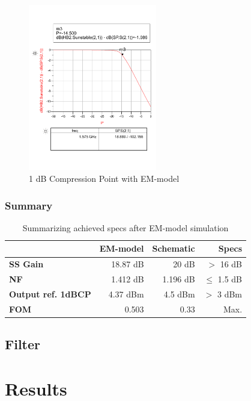 \documentclass[a4paper]{article}        %
\begin{document}
			\begin{figure}[H]
			\centering
				\includegraphics[width=0.5\textwidth]{fig/LNA/compression_post.pdf}
			\caption{1 dB Compression Point with EM-model}
			\label{fig:lna_1db_post}
			\end{figure}

		\subsubsection{Summary}

			\begin{table}[H]
			\centering
			\begin{tabular}{|l|r|r|r|}
				\hline
				 &  \textbf{EM-model} &  \textbf{Schematic} & \textbf{Specs} \\
				\hline
				\textbf{SS Gain} & 18.87 dB &  20 dB & $>$ 16 dB \\
				\hline
				\textbf{NF} & 1.412 dB & 1.196 dB & $\leq$ 1.5 dB \\
				\hline
				\textbf{Output ref. 1dBCP} & 4.37 dBm & 4.5 dBm & $>$ 3 dBm \\
				\hline
				\textbf{FOM} & 0.503 & 0.33 & Max. \\
				\hline
			\end{tabular}
			\caption{Summarizing achieved specs after EM-model simulation}
			\label{tab:lna_em_summ}
			\end{table}


	\subsection{Filter}
\section{Results}
\end{document}
